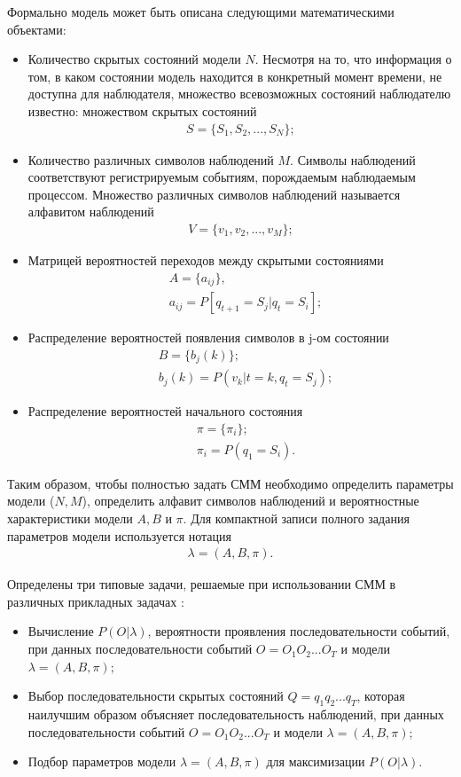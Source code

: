 Формально модель может быть описана следующими математическими объектами:
\begin{itemize}
	\item
	Количество скрытых состояний модели \(N\). Несмотря на то, что информация о том, в каком состоянии модель находится в конкретный момент времени, не доступна для наблюдателя, множество всевозможных состояний наблюдателю известно:
	множеством скрытых состояний
	\begin{align} 
		S = \{ S_1, S_2, ..., S_N \};
	\end{align}
	\item
	Количество различных символов наблюдений \(M\). Символы наблюдений соответствуют регистрируемым событиям, порождаемым наблюдаемым процессом. Множество различных символов наблюдений называется алфавитом наблюдений
	\begin{align} 
		V = \{ v_1, v_2, ..., v_M \};
	\end{align}
	\item
	Матрицей вероятностей переходов между скрытыми состояниями
	\begin{align} 
		&A = \{ a_{ij} \}, \\
		&a_{ij} = P[q_{t + 1} = S_j | q_t = S_i];
	\end{align}
	\item
	Распределение вероятностей появления символов в j-ом состоянии
	\begin{align}
		&B = \{ b_j(k) \}; \\ 
		&b_j(k) = P(v_k | t = k, q_t = S_j);
	\end{align}
	\item
	Распределение вероятностей начального состояния
	\begin{align}
		&\pi = \{\pi_i\}; \\
		&\pi_i = P(q_1 = S_i). 
	\end{align}
\end{itemize}

Таким образом, чтобы полностью задать СММ необходимо определить параметры модели (\(N, M\)), определить алфавит символов наблюдений и вероятностные характеристики модели \(A, B\) и \(\pi\). Для компактной записи полного задания параметров модели используется нотация
\begin{align}
	\lambda = (A, B, \pi).
\end{align}

Определены три типовые задачи, решаемые при использовании СММ в различных прикладных задачах \cite{Rabiner89atutorial}:
\begin{itemize}
	\item
	Вычисление \(P(O|\lambda)\), вероятности проявления последовательности событий, при данных последовательности событий \(O=O_1O_2...O_T\) и модели \(\lambda = (A, B, \pi)\);
	\item
	Выбор последовательности скрытых состояний \(Q=q_1q_2...q_T\), которая наилучшим образом объясняет последовательность наблюдений, при данных последовательности событий \(O=O_1O_2...O_T\) и модели \(\lambda = (A, B, \pi)\);
	\item
	Подбор параметров модели \(\lambda = (A, B, \pi)\) для максимизации \(P(O|\lambda)\).
\end{itemize} 

